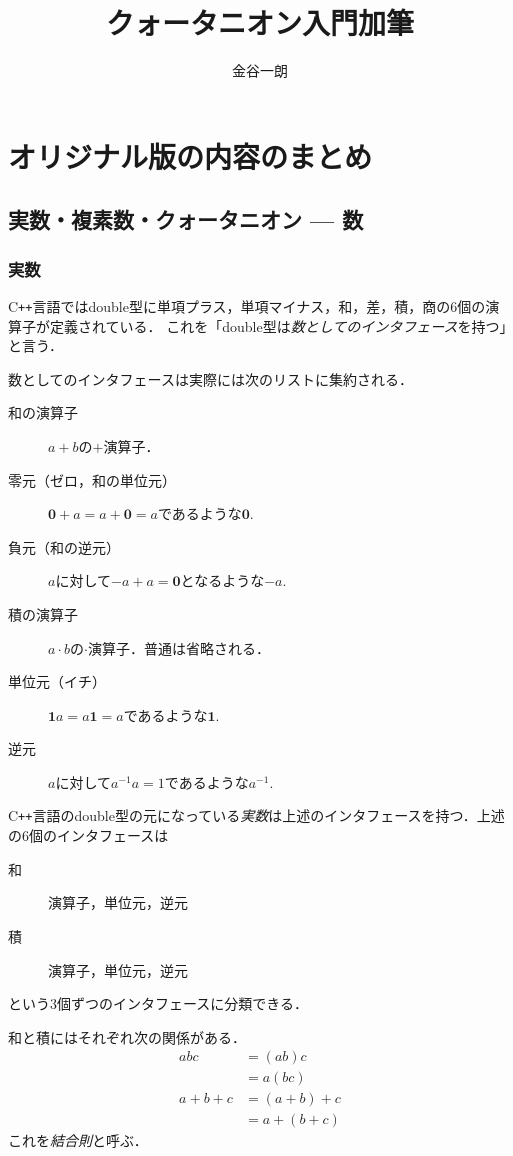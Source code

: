 \documentclass{jsbook}
\title{クォータニオン入門加筆}
\author{金谷一朗}
\newcommand{\cxx}{\textrm{C}\texttt{++}}
\newcommand{\keyword}[1]{\emph{#1}}
\newcommand{\zero}{\mathbf{0}}
\newcommand{\one}{\mathbf{1}}
\begin{document}
\setlength{\baselineskip}{17pt}
\setcounter{chapter}{-1}

\maketitle
\tableofcontents

\chapter{オリジナル版の内容のまとめ}

\section{実数・複素数・クォータニオン --- 数}

\subsection{実数}

\cxx 言語ではdouble型に単項プラス，単項マイナス，和，差，積，商の6個の演算子が定義されている．
これを「double型は\keyword{数としてのインタフェース}を持つ」と言う．

数としてのインタフェースは実際には次のリストに集約される．
\begin{description}
\item[和の演算子] $a+b$の$+$演算子．
\item[零元（ゼロ，和の単位元）] $\zero+a=a+\zero=a$であるような$\zero.$
\item[負元（和の逆元）] $a$に対して$-a+a=\zero$となるような$-a.$
\item[積の演算子] $a\cdot b$の$\cdot$演算子．普通は省略される．
\item[単位元（イチ）] $\one a=a\one=a$であるような$\one.$
\item[逆元] $a$に対して$a^{-1}a=1$であるような$a^{-1}.$
\end{description}
\cxx 言語のdouble型の元になっている\keyword{実数}は上述のインタフェースを持つ．上述の6個のインタフェースは
\begin{description}
\item[和] 演算子，単位元，逆元
\item[積] 演算子，単位元，逆元
\end{description}
という3個ずつのインタフェースに分類できる．

和と積にはそれぞれ次の関係がある．
\begin{align}
abc&=(ab)c\\
  &=a(bc)\\
a+b+c&=(a+b)+c\\
  &=a+(b+c)
\end{align}
これを\keyword{結合則}と呼ぶ．
\end{document}

